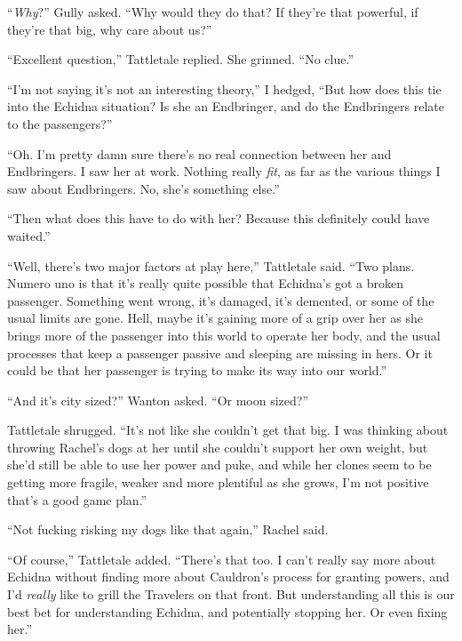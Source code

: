 ``\emph{Why}?'' Gully asked.  ``Why would they do that?  If they're that powerful, if they're that big, why care about us?''



``Excellent question,'' Tattletale replied.  She grinned. ``No clue.''



``I'm not saying it's not an interesting theory,'' I hedged, ``But how does this tie into the Echidna situation?  Is she an Endbringer, and do the Endbringers relate to the passengers?''



``Oh.  I'm pretty damn sure there's no real connection between her and Endbringers.  I saw her at work.  Nothing really \emph{fit}, as far as the various things I saw about Endbringers.  No, she's something else.''



``Then what does this have to do with her?  Because this definitely could have waited.''



``Well, there's two major factors at play here,'' Tattletale said.  ``Two plans.  Numero uno is that it's really quite possible that Echidna's got a broken passenger.  Something went wrong, it's damaged, it's demented, or some of the usual limits are gone.  Hell, maybe it's gaining more of a grip over her as she brings more of the passenger into this world to operate her body, and the usual processes that keep a passenger passive and sleeping are missing in hers.  Or it could be that her passenger is trying to make its way into our world.''



``And it's city sized?'' Wanton asked.  ``Or moon sized?''



Tattletale shrugged.  ``It's not like she couldn't get that big.  I was thinking about throwing Rachel's dogs at her until she couldn't support her own weight, but she'd still be able to use her power and puke, and while her clones seem to be getting more fragile, weaker and more plentiful as she grows, I'm not positive that's a good game plan.''



``Not fucking risking my dogs like that again,'' Rachel said.



``Of course,'' Tattletale added.  ``There's that too.  I can't really say more about Echidna without finding more about Cauldron's process for granting powers, and I'd \emph{really} like to grill the Travelers on that front.  But understanding all this is our best bet for understanding Echidna, and potentially stopping her.  Or even fixing her.''



